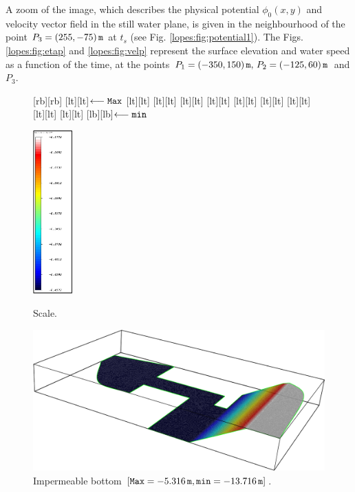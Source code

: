  A zoom of the image, which  describes
the physical potential \(\phi_0(x,y)\) and velocity vector field in the still
water plane, is given in  the neighbourhood of  the
point \(P_3=(255,-75)\,{\tt m}\) at \(t_s\) (see
Fig. \ref{lopes:fig:potential1}).
The Figs. \ref{lopes:fig:etap} and \ref{lopes:fig:velp} represent
 the surface elevation and water speed as a function of the
 time, at the
points \(P_1=(-350, 150)\,{\tt m},\, P_2=(-125,60)\,{\tt
m}\) and \(P_3\).
\begin{figure}[!htb]
\begin{minipage}[t]{0.3\linewidth}
[rb][rb]{}
[lt][lt]{\(\longleftarrow\tt Max\)}
[lt][lt]{}
[lt][lt]{}
[lt][lt]{}
[lt][lt]{}
[lt][lt]{}
[lt][lt]{}
[lt][lt]{}
[lt][lt]{}
[lt][lt]{}
[lb][lb]{\(\longleftarrow\tt min\)}
{\centering
\includegraphics[width=1.5cm]{chapters/lopes/pdf/table.pdf}
\caption{Scale.}\label{lopes:fig:scale}\par}
\end{minipage}\hfill
\begin{minipage}[t]{0.7\linewidth}
{\centering
\includegraphics[width=\largewidth]{chapters/lopes/pdf/depth.pdf}
\caption{Impermeable bottom \newline \([{\tt Max}=-5.316\,{\tt m},{\tt min}=-13.716\,{\tt m}]\).}
\label{lopes:fig:harbour_depth}\par}
\end{minipage}
\end{figure}
